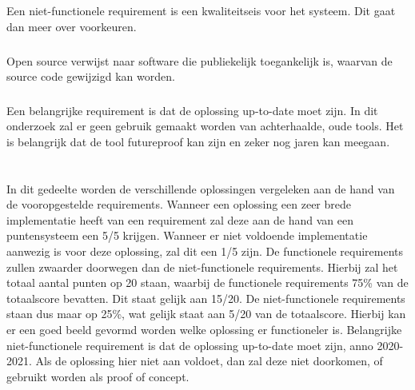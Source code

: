 \subsection{}
\label{subsec:Niet-functionele Requirements}
Een niet-functionele requirement is een kwaliteitseis voor het systeem. Dit gaat dan meer over voorkeuren.

\subsubsection{}
\label{subsubsec:Open source}
Open source verwijst naar software die publiekelijk toegankelijk is, waarvan de source code gewijzigd kan worden.

\subsubsection{}
\label{subsubsecAnno 2020-2021}
Een belangrijke requirement is dat de oplossing up-to-date moet zijn. In dit onderzoek zal er geen gebruik gemaakt worden van achterhaalde, oude tools. Het is belangrijk dat de tool futureproof kan zijn en zeker nog jaren kan meegaan.




\section{}
\label{sec:Hoe beantwoorden de verschillende oplossingen aan de bovenstaande schifting}

In dit gedeelte worden de verschillende oplossingen vergeleken aan de hand van de vooropgestelde requirements. Wanneer een oplossing een zeer brede implementatie heeft van een requirement zal deze aan de hand van een puntensysteem een 5/5 krijgen. Wanneer er niet voldoende implementatie aanwezig is voor deze oplossing, zal dit een 1/5 zijn. De functionele requirements zullen zwaarder doorwegen dan de niet-functionele requirements. Hierbij zal het totaal aantal punten op 20 staan, waarbij de functionele requirements 75\% van de totaalscore bevatten. Dit staat gelijk aan 15/20. De niet-functionele requirements staan dus maar op 25\%, wat gelijk staat aan 5/20 van de totaalscore. Hierbij kan er een goed beeld gevormd worden welke oplossing er functioneler is. Belangrijke niet-functionele requirement is dat de oplossing up-to-date moet zijn, anno 2020-2021. Als de oplossing hier niet aan voldoet, dan zal deze niet doorkomen, of gebruikt worden als proof of concept.

